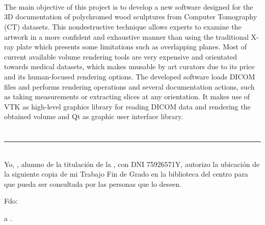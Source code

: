 \begin{center}
	\myName \\
\end{center}

\vspace{0.7cm}
\\

\vspace{0.7cm}
\\

The main objective of this project is to develop a new software designed for the 3D documentation of polychromed wood sculptures from Computer Tomography (CT) datasets. This nondestructive technique allows experts to examine the artwork in a more confident and exhaustive manner than using the traditional X-ray plate which presents some limitations such as overlapping planes. Most of current available volume rendering tools are very expensive and orientated towards medical datasets, which makes unusable by art curators due to its price and its human-focused rendering options. The developed software loads DICOM files and performs rendering operations and several documentation actions, such as taking measurements or extracting slices at any orientation. It makes use of VTK as high-level graphics library for reading DICOM data and rendering the obtained volume and Qt as graphic user interface library.


\chapter*{}
\thispagestyle{empty}

\noindent\rule[-1ex]{\textwidth}{2pt}\\[4.5ex]

Yo, \textbf{\myName}, alumno de la titulación \myDegree de la \textbf{\myFaculty}, con DNI 75926571Y, autorizo la ubicación de la siguiente copia de mi Trabajo Fin de Grado en la biblioteca del centro para que pueda ser consultada por las personas que lo deseen.

\vspace{6cm}

\noindent Fdo: \myName

\vspace{2cm}

\begin{flushright}
\myLocation a \myTime.
\end{flushright}


